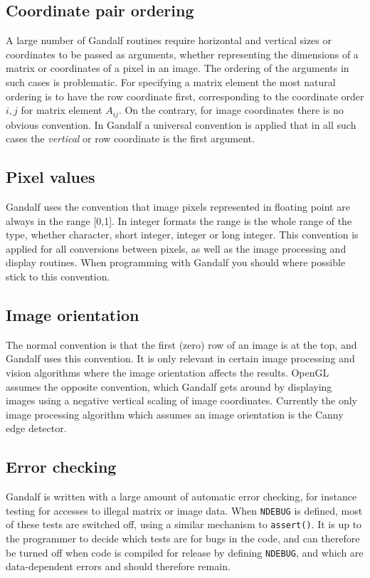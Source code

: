 \subsection{Coordinate pair ordering}
A large number of Gandalf routines require horizontal and vertical sizes
or coordinates to be passed as arguments, whether representing the dimensions
of a matrix or coordinates of a pixel in an image. The ordering of the
arguments in such cases is problematic. For specifying a matrix element
the most natural ordering is to have the row coordinate first, corresponding
to the coordinate order $i,j$ for matrix element $A_{ij}$.
On the contrary, for image coordinates there is no obvious convention.
In Gandalf a universal convention is applied that in all such cases the
{\em vertical} or row coordinate is the first argument.

\subsection{Pixel values}
Gandalf uses the convention that image pixels represented in floating point
are always in the range [0,1]. In integer formats the range is the whole
range of the type, whether character, short integer, integer or long integer.
This convention is applied for all conversions between pixels, as well as
the image processing and display routines. When programming with Gandalf
you should where possible stick to this convention.

\subsection{Image orientation}
The normal convention is that the first (zero) row of an image is at the top,
and Gandalf uses this convention. It is only relevant in certain image
processing and vision algorithms where the image orientation affects
the results. OpenGL assumes the opposite convention, which Gandalf gets
around by displaying images using a negative vertical scaling of image
coordinates. Currently the only image processing algorithm which assumes
an image orientation is the Canny edge detector.

\subsection{Error checking}
Gandalf is written with a large amount of automatic error checking, for
instance testing for accesses to illegal matrix or image data.
When {\tt NDEBUG} is defined, most of these tests are switched off,
using a similar mechanism to {\tt assert()}. It is up to the programmer
to decide which tests are for bugs in the code, and can therefore be
turned off when code is compiled for release by defining {\tt NDEBUG}, and
which are data-dependent errors and should therefore remain.


